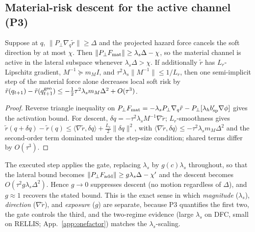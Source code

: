 \subsection{Material-risk descent for the active channel (P3)}
\begin{theorem}\label{thm:descent}
Suppose at $q$, $\|P_\perp\nabla_q\tilde r\|\ge\Delta$ and the projected hazard
force cancels the soft direction by at most $\chi$. Then
$\|P_\perp F_{\rm mat}\|\ge\lambda_s\Delta-\chi$, so the material channel is
active in the lateral subspace whenever $\lambda_s\Delta>\chi$. If additionally
$\tilde r$ has $L_r$-Lipschitz gradient, $M^{-1}\succeq m_M I$, and
$\tau^2\lambda_s\|M^{-1}\|\le1/L_r$, then one semi-implicit step of the material
force alone decreases local soft risk by
$\tilde r(q_{t+1})-\tilde r(q_{t+1}^{\rm geo})\le-\tfrac12\tau^2\lambda_s m_M\Delta^2+O(\tau^3)$.
\end{theorem}
\begin{proof}
Reverse triangle inequality on
$P_\perp F_{\rm mat}=-\lambda_s P_\perp\nabla_q\tilde r-P_\perp[\lambda_h b_{\rm sp}'\nabla\phi]$
gives the activation bound. For descent, $\delta q=-\tau^2\lambda_s M^{-1}\nabla\tilde r$;
$L_r$-smoothness gives
$\tilde r(q+\delta q)-\tilde r(q)\le\langle\nabla\tilde r,\delta q\rangle+\tfrac{L_r}2\|\delta q\|^2$,
with $\langle\nabla\tilde r,\delta q\rangle\le-\tau^2\lambda_s m_M\Delta^2$ and the
second-order term dominated under the step-size condition; shared terms differ by
$O(\tau^3)$.
\end{proof}
The executed step applies the
gate, replacing $\lambda_s$ by $g(c)\lambda_s$ throughout, so that the lateral bound
becomes $\|P_\perp F_{\rm add}\|\ge g\lambda_s\Delta-\chi'$ and the descent
becomes $O(\tau^2 g\lambda_s\Delta^2)$. Hence $g\!\to\!0$ suppresses descent
(no motion regardless of $\Delta$), and $g\!\approx\!1$ recovers the stated
bound. This is the exact sense in which \emph{magnitude} ($\lambda_s$),
\emph{direction} ($\nabla\tilde r$), and \emph{exposure} ($g$) are separate, because
P3 quantifies the first two, the gate controls the third, and the two-regime
evidence (large $\lambda_s$ on DFC, small on RELLIS; App.~\ref{app:onefactor})
matches the $\lambda_s$-scaling.

